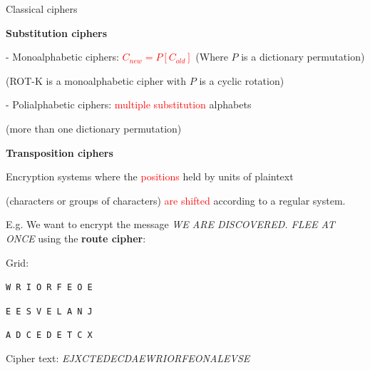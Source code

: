 \begin{frame}{Classical ciphers}

\textbf{Substitution ciphers}

\phantom{pad}- Monoalphabetic ciphers: \textcolor{red}{$C_{new} = P[C_{old}]$} (Where $P$ is a dictionary permutation)

\smallskip

\phantom{pad}(ROT-K is a monoalphabetic cipher with $P$ is a cyclic rotation)

\smallskip

\phantom{pad}- Polialphabetic ciphers: \textcolor{red}{multiple substitution} alphabets 

\phantom{pad}(more than one dictionary permutation)

\smallskip

\textbf{Transposition ciphers}

\phantom{pad}Encryption systems where the \textcolor{red}{positions} held by units of plaintext 

\phantom{pad}(characters or groups of characters) \textcolor{red}{are shifted} according to a regular system.

\smallskip

E.g. We want to encrypt the message \textit{WE ARE DISCOVERED. FLEE AT ONCE} using the \textbf{route cipher}:

Grid: 

\centerline{\texttt{W R I O R F E O E}}
\centerline{\texttt{E E S V E L A N J}}
\centerline{\texttt{A D C E D E T C X}}

Cipher text: \textit{EJXCTEDECDAEWRIORFEONALEVSE}

\end{frame}
